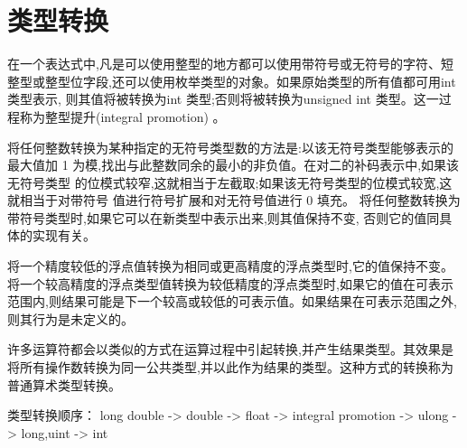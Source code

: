
\section{类型转换}
\label{typeConv}
在一个表达式中,凡是可以使用整型的地方都可以使用带符号或无符号的字符、短整型或整型位字段,还可以使用枚举类型的对象。如果原始类型的所有值都可用int 类型表示, 则其值将被转换为int 类型;否则将被转换为unsigned int 类型。这一过程称为整型提升(integral promotion) 。

将任何整数转换为某种指定的无符号类型数的方法是:以该无符号类型能够表示的最大值加 1 为模,找出与此整数同余的最小的非负值。在对二的补码表示中,如果该无符号类型 的位模式较窄,这就相当于左截取;如果该无符号类型的位模式较宽,这就相当于对带符号 值进行符号扩展和对无符号值进行 0 填充。 将任何整数转换为带符号类型时,如果它可以在新类型中表示出来,则其值保持不变, 否则它的值同具体的实现有关。 

将一个精度较低的浮点值转换为相同或更高精度的浮点类型时,它的值保持不变。将一个较高精度的浮点类型值转换为较低精度的浮点类型时,如果它的值在可表示范围内,则结果可能是下一个较高或较低的可表示值。如果结果在可表示范围之外,则其行为是未定义的。 


许多运算符都会以类似的方式在运算过程中引起转换,并产生结果类型。其效果是将所有操作数转换为同一公共类型,并以此作为结果的类型。这种方式的转换称为普通算术类型转换。


类型转换顺序：
long double -> double -> float -> integral promotion -> ulong -> long,uint -> int

